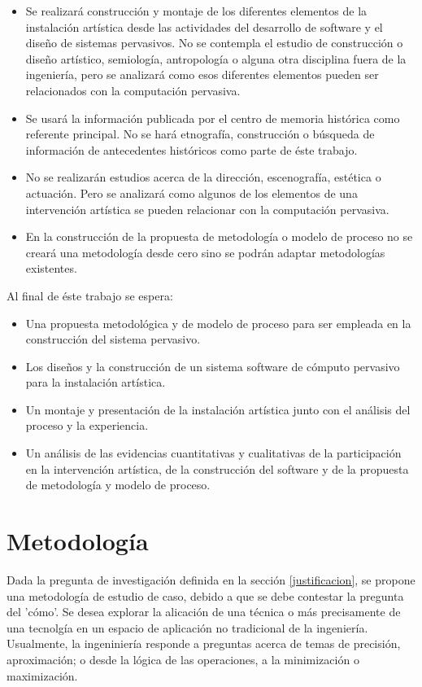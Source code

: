 \begin{itemize}
    \item Se realizará construcción y montaje de los diferentes elementos de la instalación artística desde las actividades del desarrollo de software y el diseño de sistemas pervasivos. No se contempla el estudio de construcción o diseño artístico, semiología, antropología o alguna otra disciplina fuera de la ingeniería, pero se analizará como esos diferentes elementos pueden ser relacionados con la computación pervasiva.
    \item Se usará la información publicada por el centro de memoria histórica como referente principal. No se hará etnografía, construcción o búsqueda de información de antecedentes históricos como parte de éste trabajo.
    \item No se realizarán estudios acerca de la dirección, escenografía, estética o actuación. Pero se analizará como algunos de los elementos de una intervención artística se pueden relacionar con la computación pervasiva.
    \item En la construcción de la propuesta de metodología o modelo de proceso no se creará una metodología desde cero sino se podrán adaptar metodologías existentes.
\end{itemize}

Al final de éste trabajo se espera:

\begin{itemize}
\item Una propuesta metodológica y de modelo de proceso para ser empleada en la construcción del sistema pervasivo.
\item Los diseños y la construcción de un sistema software de cómputo pervasivo para la instalación artística.
\item Un montaje y presentación de la instalación artística junto con el análisis del proceso y la experiencia.
\item Un análisis de las evidencias cuantitativas y cualitativas de la participación en la intervención artística, de la construcción del software y de la propuesta de metodología y modelo de proceso.

\end{itemize}

\section{Metodología}

Dada la pregunta de investigación definida en la sección \ref{justificacion}, se propone una metodología de estudio de caso\cite{robertkyin}, debido a que se debe contestar la pregunta del 'cómo'. Se desea explorar la alicación de una técnica o más precisamente de una tecnolgía en un espacio de aplicación no tradicional de la ingeniería. Usualmente, la ingeniniería responde a preguntas acerca de temas de precisión, aproximación; o desde la lógica de las operaciones, a la minimización o maximización.

